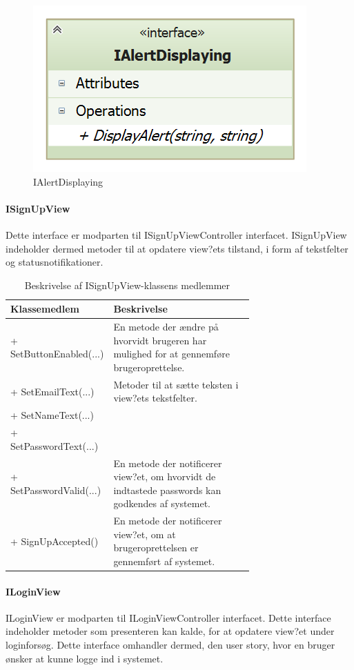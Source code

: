 \begin{figure}
	\centering
	\includegraphics[width=0.3\linewidth]{figs/design/application_ialertdisplaying}
	\caption{IAlertDisplaying}
	\label{fig:application_ialertdisplaying}
\end{figure}

\paragraph{ISignUpView}
Dette interface er modparten til ISignUpViewController interfacet. ISignUpView indeholder dermed metoder til at opdatere view?ets tilstand, i form af tekstfelter og statusnotifikationer.

\begin{table}
	\centering
	\begin{tabular}{| l | p{0.7\linewidth} |}
		\toprule
		\textbf{Klassemedlem}	& \textbf{Beskrivelse} \\
		\midrule
		+ SetButtonEnabled(...)				& En metode der ændre på hvorvidt brugeren har mulighed for at gennemføre brugeroprettelse.	\\\hline
		+ SetEmailText(...)				& Metoder til at sætte teksten i view?ets tekstfelter. \\
		+ SetNameText(...)				& \\
		+ SetPasswordText(...)				& \\\hline
		+ SetPasswordValid(...) 					& En metode der notificerer view?et, om hvorvidt de indtastede passwords kan godkendes af systemet. \\\hline
		+ SignUpAccepted()				& En metode der notificerer view?et, om at brugeroprettelsen er gennemført af systemet. \\
		\bottomrule
		\end{tabular}
	\caption{Beskrivelse af ISignUpView-klassens medlemmer}
	\label{tab:table_design_isignupview}	
\end{table}

\paragraph{ILoginView}
ILoginView er modparten til ILoginViewController interfacet. Dette interface indeholder metoder som presenteren kan kalde, for at opdatere view?et under loginforsøg. Dette interface omhandler dermed, den user story, hvor en bruger ønsker at kunne logge ind i systemet.

